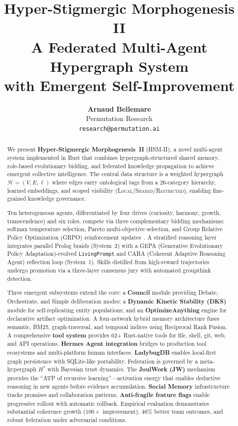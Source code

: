 \documentclass[11pt]{article}
\title{
  \vspace{-0.5em}
  \LARGE\textbf{Hyper-Stigmergic Morphogenesis II}\\[0.4em]
  \large A Federated Multi-Agent Hypergraph System\\
  with Emergent Self-Improvement
  \vspace{-0.3em}
}
\author{
  \textbf{Arnaud Bellemare} \\[0.2em]
  Permutation Research \\
  \texttt{research@permutation.ai}
}
\date{}
\begin{document}
\maketitle
\thispagestyle{empty}

\begin{abstract}
\noindent
We present \textbf{Hyper-Stigmergic Morphogenesis~II} (HSM-II), a novel multi-agent
system implemented in Rust that combines hypergraph-structured shared memory,
role-based evolutionary bidding, and federated knowledge propagation to achieve
emergent collective intelligence. The central data structure is a weighted hypergraph
$\mathcal{H} = (V, E, \ell)$ where edges carry ontological tags from a 
26-category hierarchy, learned embeddings, and scoped visibility (\textsc{Local}/\textsc{Shared}/\textsc{Restricted}),
enabling fine-grained knowledge governance.

Ten heterogeneous agents, differentiated by four drives (curiosity, harmony, 
growth, transcendence) and six roles, compete via three complementary bidding 
mechanisms: softmax temperature selection, Pareto multi-objective selection, 
and Group Relative Policy Optimization (GRPO) reinforcement updates~\cite{shao2024grpo}.
A stratified reasoning layer integrates parallel Prolog braids (System~2) with a 
GEPA (Generative Evolutionary Policy Adaptation)-evolved \texttt{LivingPrompt} and CARA (Coherent Adaptive Reasoning Agent) reflection loop (System~1). Skills 
distilled from high-reward trajectories undergo promotion via a three-layer 
consensus jury with automated groupthink detection.

Three emergent subsystems extend the core: a \textbf{Council} module providing 
Debate, Orchestrate, and Simple deliberation modes; a \textbf{Dynamic Kinetic 
Stability (DKS)} module for self-replicating entity populations; and an 
\textbf{OptimizeAnything} engine for declarative artifact optimization. A 
four-network hybrid memory architecture fuses semantic, BM25, graph-traversal, 
and temporal indices using Reciprocal Rank Fusion. A comprehensive \textbf{tool 
system} provides 62+ Rust-native tools for file, shell, git, web, and API 
operations. \textbf{Hermes Agent integration} bridges to production tool 
ecosystems and multi-platform human interfaces. \textbf{LadybugDB} enables 
local-first graph persistence with SQLite-like portability. Federation is 
governed by a meta-hypergraph $H^*$ with Bayesian trust dynamics. The
\textbf{JoulWork (JW)} mechanism provides the ``ATP of recursive
learning''---activation energy that enables deductive reasoning in new agents
before evidence accumulation. \textbf{Social Memory} infrastructure tracks
promises and collaboration patterns. \textbf{Anti-fragile feature flags}
enable progressive rollout with automatic rollback. Empirical evaluation
demonstrates substantial coherence growth ($100\times$ improvement), 46\%
better team outcomes, and robust federation under adversarial conditions.
\end{abstract}
\end{document}
